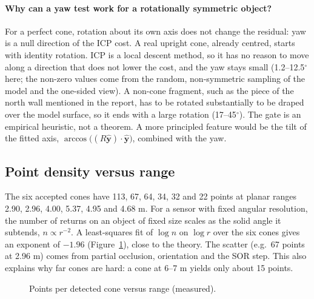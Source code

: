 \documentclass[10pt,a4paper]{scrartcl}
\renewcommand{\emph}[1]{\textcolor{accent}{#1}}
\begin{document}
  \paragraph{Why can a yaw test work for a rotationally symmetric object?}
  For a perfect cone, rotation about its own axis does not change the residual: yaw is
  a \emph{null direction} of the ICP cost. A real upright cone, already centred,
  starts with identity rotation. ICP is a local descent method, so it has no reason
  to move along a direction that does not lower the cost, and the yaw stays small
  (1.2--12.5$^\circ$ here; the non-zero values come from the random, non-symmetric
  sampling of the model and the one-sided view). A non-cone fragment, such as the piece of
  the north wall mentioned in the report, has to be rotated substantially to be draped over
  the model surface, so it ends with a large rotation (17--45$^\circ$). The gate is
  an empirical heuristic, not a theorem. A more principled feature would be the
  \emph{tilt} of the fitted axis, $\arccos\big((R\hat{\bm y})\cdot\hat{\bm y}\big)$,
  combined with the yaw.

  \subsection{Point density versus range}

  The six accepted cones have 113, 67, 64, 34, 32 and 22 points at planar ranges 2.90,
  2.96, 4.00, 5.37, 4.95 and 4.68 m. For a sensor with fixed angular resolution, the
  number of returns on an object of fixed size scales as the solid angle it subtends,
  $n\propto r^{-2}$. A least-squares fit of $\log n$ on $\log r$ over the six cones gives
  an exponent of $-1.96$ (Figure~\ref{fig:density}), close to the theory. The scatter
  (e.g.\ 67 points at 2.96 m) comes from partial occlusion, orientation and the SOR
  step. This also explains why far cones are hard: a cone at 6--7 m yields only about 15
  points.

  \begin{figure}[H]
  \centering
  \caption{Points per detected cone versus range (measured).}
  \label{fig:density}
  \end{figure}
\end{document}
